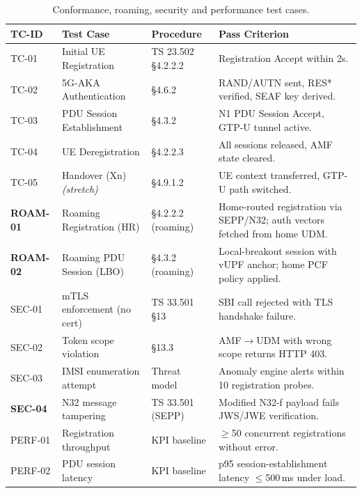 \documentclass[11pt,a4paper]{report}
\begin{document}
\begin{table}[h]
\centering
\footnotesize
\renewcommand{\arraystretch}{1.25}
\begin{tabularx}{\linewidth}{@{}l l l X@{}}
\toprule
\textbf{TC-ID} & \textbf{Test Case} & \textbf{Procedure} & \textbf{Pass Criterion}\\
\midrule
TC-01   & Initial UE Registration       & TS 23.502 §4.2.2.2 & Registration Accept within 2s.\\
TC-02   & 5G-AKA Authentication         & §4.6.2             & RAND/AUTN sent, RES* verified, SEAF key derived.\\
TC-03   & PDU Session Establishment     & §4.3.2             & N1 PDU Session Accept, GTP-U tunnel active.\\
TC-04   & UE Deregistration             & §4.2.2.3           & All sessions released, AMF state cleared.\\
TC-05   & Handover (Xn) \emph{(stretch)}& §4.9.1.2           & UE context transferred, GTP-U path switched.\\
\textbf{ROAM-01} & Roaming Registration (HR) & §4.2.2.2 (roaming) &
  Home-routed registration via SEPP/N32; auth vectors fetched from home UDM.\\
\textbf{ROAM-02} & Roaming PDU Session (LBO) & §4.3.2 (roaming) &
  Local-breakout session with vUPF anchor; home PCF policy applied.\\
SEC-01  & mTLS enforcement (no cert)    & TS 33.501 §13      & SBI call rejected with TLS handshake failure.\\
SEC-02  & Token scope violation         & §13.3              & AMF$\rightarrow$UDM with wrong scope returns HTTP 403.\\
SEC-03  & IMSI enumeration attempt      & Threat model       & Anomaly engine alerts within 10 registration probes.\\
\textbf{SEC-04} & N32 message tampering  & TS 33.501 (SEPP)  & Modified N32-f payload fails JWS/JWE verification.\\
PERF-01 & Registration throughput       & KPI baseline       & $\geq$50 concurrent registrations without error.\\
PERF-02 & PDU session latency           & KPI baseline       & p95 session-establishment latency $\leq$500\,ms under load.\\
\bottomrule
\end{tabularx}
\caption{Conformance, roaming, security and performance test cases.}
\label{tab:testcases}
\end{table}
\end{document}
